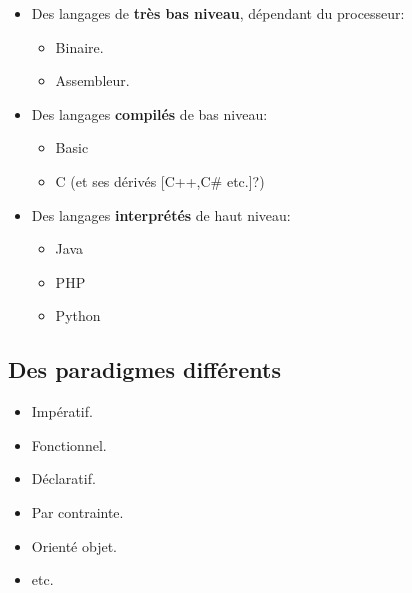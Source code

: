 \begin{slide}
	\begin{itemize}
		\item Des langages de \textbf{très bas niveau}, dépendant du processeur:
		\begin{itemize}
			\item Binaire.
			\item Assembleur.
		\end{itemize}
		\item Des langages \textbf{compilés} de bas niveau:
		\begin{itemize}
			\item Basic
			\item C (et ses dérivés [C++,C\# etc.]?)
		\end{itemize}
		\item Des langages \textbf{interprétés} de haut niveau:
		\begin{itemize}
			\item Java
			\item PHP
			\item Python
		\end{itemize}
	\end{itemize}
\end{slide}

\subsection{Des paradigmes différents}
\begin{slide}
	\begin{itemize}
		\item Impératif.
		\item Fonctionnel.
		\item Déclaratif.
		\item Par contrainte.
		\item Orienté objet.
		\item etc.
	\end{itemize}
\end{slide}

